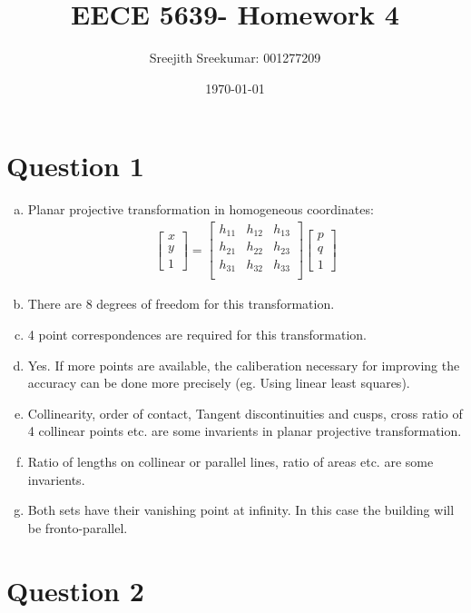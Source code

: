 \documentclass{article}
\title{EECE 5639- Homework 4}
\author{Sreejith Sreekumar: 001277209}
\date{\today}
\begin{document}
\maketitle

\section*{Question 1}
\begin{enumerate}[(a)]

\item   Planar projective transformation in homogeneous coordinates:
\begin{gather}
 \begin{bmatrix} x \\ y \\ 1  \end{bmatrix}
 =
\begin{bmatrix} 
h_{11} & h_{12} & h_{13}\\
h_{21} & h_{22} & h_{23}\\
h_{31} & h_{32} & h_{33}\\
\end{bmatrix}
 \begin{bmatrix} p \\ q \\ 1  \end{bmatrix}
\end{gather}

\item There are 8 degrees of freedom for this transformation.
\item 4 point correspondences are required for this transformation.
\item Yes. If more points are available, the caliberation necessary for improving the
  accuracy can be done more precisely (eg. Using linear least squares).
\item Collinearity, order of contact, Tangent discontinuities and cusps,
  cross ratio of 4 collinear points etc. are some invarients in planar projective transformation.
\item  Ratio of lengths on collinear or parallel lines, ratio of areas etc. are some invarients.
\item  Both sets have their vanishing point at infinity. In this case the building will be fronto-parallel. 
\end{enumerate}

\section*{Question 2}
\end{document}

